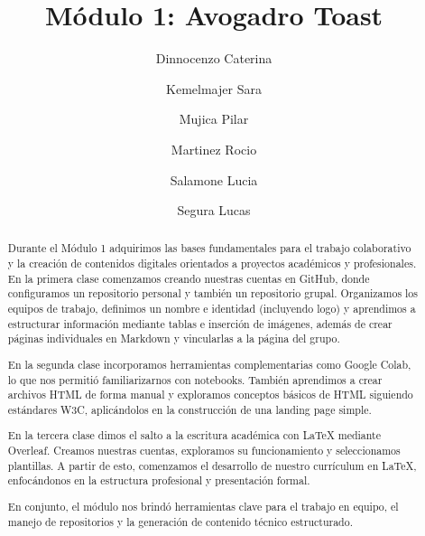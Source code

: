 \documentclass[runningheads]{llncs}
\begin{document}
%
\title{Módulo 1: Avogadro Toast}
%
%
\author{Dinnocenzo Caterina \and
Kemelmajer Sara \and
Mujica Pilar\and
Martinez Rocio\and
Salamone Lucia\and
Segura Lucas}
%
%
%
\maketitle              %
%
\begin{abstract}
Durante el Módulo 1 adquirimos las bases fundamentales para el trabajo colaborativo y la creación de contenidos digitales orientados a proyectos académicos y profesionales. En la primera clase comenzamos creando nuestras cuentas en GitHub,\cite{githubdocs} donde configuramos un repositorio personal y también un repositorio grupal. Organizamos los equipos de trabajo, definimos un nombre e identidad (incluyendo logo) y aprendimos a estructurar información mediante tablas e inserción de imágenes, además de crear páginas individuales en Markdown y vincularlas a la página del grupo.

En la segunda clase incorporamos herramientas complementarias como Google Colab, lo \cite{lopez2003latex} que nos permitió familiarizarnos con notebooks. También aprendimos a crear archivos HTML de forma manual y exploramos conceptos básicos de HTML siguiendo estándares W3C, aplicándolos en la construcción de una landing page simple.

En la tercera clase dimos \cite{sepulcre2024uso} el salto a la escritura académica con LaTeX mediante Overleaf. Creamos nuestras cuentas, exploramos su funcionamiento y seleccionamos plantillas. A partir de esto, comenzamos el desarrollo de nuestro currículum en LaTeX, enfocándonos en la estructura profesional y presentación formal.

En conjunto, el módulo nos brindó herramientas clave para el trabajo en equipo, el manejo de repositorios \cite{loeliger2012version} y la generación de contenido técnico estructurado.


\end{abstract}
%
%
%
\end{document}
